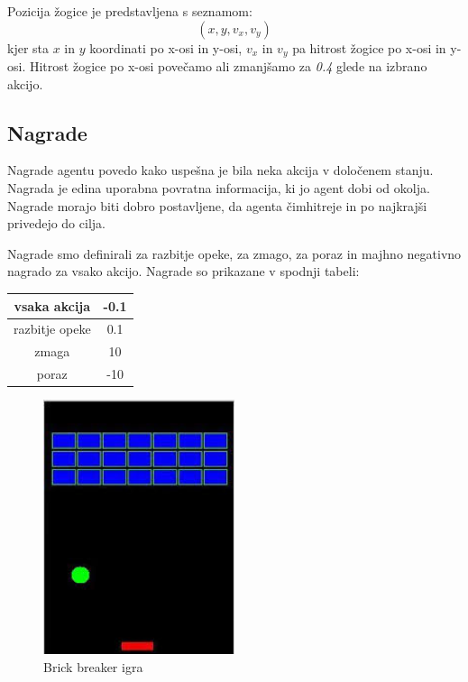 \documentclass[a4paper]{article}
\begin{document}
Pozicija žogice je predstavljena s seznamom:
\[
(x, y, v_x, v_y)
\]
kjer sta $x$ in $y$ koordinati po x-osi in y-osi, $v_x$ in $v_y$ pa hitrost žogice po x-osi in y-osi. Hitrost žogice po x-osi povečamo ali zmanjšamo za \emph{0.4} glede na izbrano akcijo.

\subsection{Nagrade}

Nagrade agentu povedo kako uspešna je bila neka akcija v določenem stanju. Nagrada je edina uporabna povratna informacija, ki jo agent dobi od okolja. Nagrade morajo biti dobro postavljene, da agenta čimhitreje in po najkrajši privedejo do cilja. 

Nagrade smo definirali za razbitje opeke, za zmago, za poraz in majhno negativno nagrado za vsako akcijo. Nagrade so prikazane v spodnji tabeli:

\begin{center}
\begin{tabular}{|c|c|}
	\hline
	vsaka akcija & -0.1 \\\hline
	razbitje opeke & 0.1 \\\hline
	zmaga & 10 \\\hline
	poraz & -10 \\
	\hline
\end{tabular}
\end{center}

\begin{figure}
\centering
\includegraphics[width=0.5\textwidth]{brick.jpg}
\caption{Brick breaker igra}
\end{figure}
\end{document}
